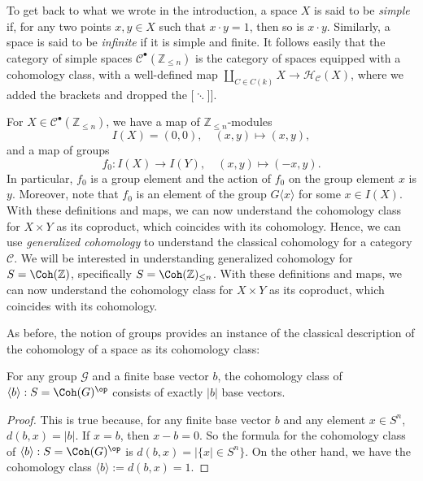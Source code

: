 \documentclass[a4paper,reqno,oneside]{article}
\begin{document}
To get back to what we wrote in the introduction, a space $X$ is said to be \textit{simple} if, for any two points $x, y \in X$ such that $x \cdot y = 1$, then so is $x \cdot y$. Similarly, a space is said to be \textit{infinite} if it is simple and finite. It follows easily that the category of simple spaces $\mathcal C^{\bullet}(\mathbb{Z}_{\le n})$ is the category of spaces equipped with a cohomology class, with a well-defined map $\coprod_{C \in C(k)} X \to \mathcal H_{\mathcal C}(X)$, where we added the brackets and dropped the $[$$ \ddots $$ $]].

For $X \in \mathcal C^{\bullet}(\mathbb{Z}_{\le n})$, we have a map of $\mathbb{Z}_{\le n}$-modules
\[
I(X) = (0, 0), \quad (x, y) \mapsto (x, y),
\]
and a map of groups
\[
f_0 : I(X) \to I(Y), \quad (x, y) \mapsto (-x, y).
\]
In particular, $f_0$ is a group element and the action of $f_0$ on the group element $x$ is $y$. Moreover, note that $f_0$ is an element of the group $G \langle x \rangle$ for some $x \in I(X)$.
%
With these definitions and maps, we can now understand the cohomology class for $X \times Y$ as its coproduct, which coincides with its cohomology. Hence, we can use \textit{generalized cohomology} to understand the classical cohomology for a category $\mathcal C$. We will be interested in understanding generalized cohomology for $S = \Coh(\mathbb Z)$, specifically $S = \Coh(\mathbb Z)_{\le n}$. With these definitions and maps, we can now understand the cohomology class for $X \times Y$ as its coproduct, which coincides with its cohomology. 

As before, the notion of groups provides an instance of the classical description of the cohomology of a space as its cohomology class:
\begin{lemma}
	For any group $\mathcal G$ and a finite base vector $b$, the cohomology class of $\langle b \rangle : S = \Coh(G)^{\op}$ consists of exactly $|b|$ base vectors.
\end{lemma}
\begin{proof}
	This is true because, for any finite base vector $b$ and any element $x \in S^n$, $d(b, x) = |b|$. If $x = b$, then $x - b = 0$. So the formula for the cohomology class of $\langle b \rangle : S = \Coh(G)^{\op}$ is $d(b, x) = |\{x| \in S^n\}$. On the other hand, we have the cohomology class $\langle b \rangle := d(b, x) = 1$.
\end{proof}
\end{document}
